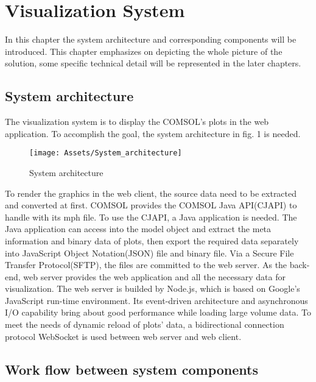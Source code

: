 \chapter{Visualization System}
In this chapter the system architecture and corresponding components will be introduced. This chapter emphasizes on depicting the whole picture of the solution, some specific technical detail will be represented in the later chapters.

\section{System architecture}

The visualization system is to display the COMSOL's plots in the web application. To accomplish the goal, the system architecture in fig. 1 is needed.

\begin{figure}[htb]
  \centering
  \texttt{[image: Assets/System\_architecture]}
  \caption{System architecture}
\end{figure}

To render the graphics in the web client, the source data need to be extracted and converted at first. COMSOL provides the COMSOL Java API(CJAPI) to handle with its mph file. To use the CJAPI, a Java application is needed. The Java application can access into the model object and extract the meta information and binary data of plots, then export the required data separately into JavaScript Object Notation(JSON) file and binary file. Via a Secure File Transfer Protocol(SFTP), the files are committed to the web server. As the back-end, web server provides the web application and all the necessary data for visualization. The web server is builded by Node.js, which is based on Google's JavaScript run-time environment. Its event-driven architecture and asynchronous I/O capability bring about good performance while loading large volume data. To meet the needs of dynamic reload of plots' data, a bidirectional connection protocol WebSocket is used between web server and web client.

\section{Work flow between system components} 